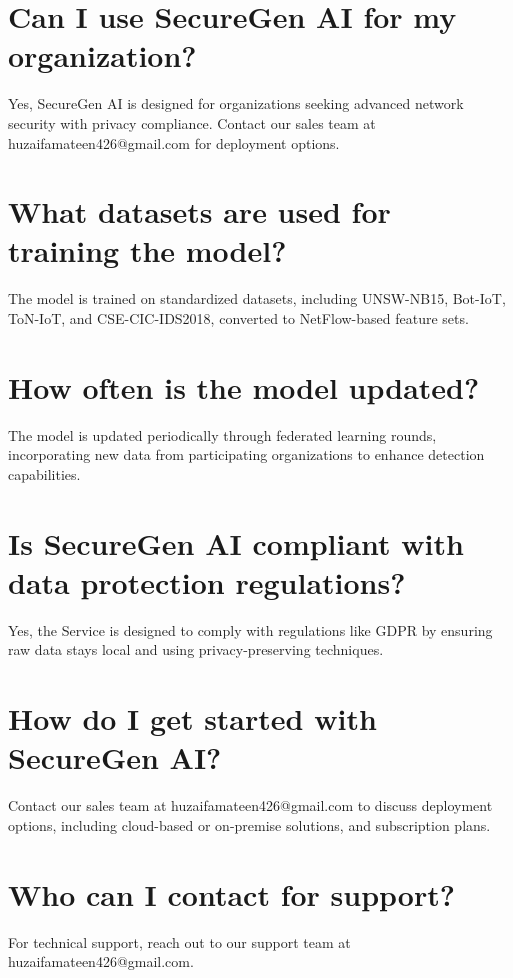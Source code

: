 \documentclass[12pt]{article}
\begin{document}
\section*{Can I use SecureGen AI for my organization?}
Yes, SecureGen AI is designed for organizations seeking advanced network security with privacy compliance. Contact our sales team at huzaifamateen426@gmail.com for deployment options.

\section*{What datasets are used for training the model?}
The model is trained on standardized datasets, including UNSW-NB15, Bot-IoT, ToN-IoT, and CSE-CIC-IDS2018, converted to NetFlow-based feature sets.

\section*{How often is the model updated?}
The model is updated periodically through federated learning rounds, incorporating new data from participating organizations to enhance detection capabilities.

\section*{Is SecureGen AI compliant with data protection regulations?}
Yes, the Service is designed to comply with regulations like GDPR by ensuring raw data stays local and using privacy-preserving techniques.

\section*{How do I get started with SecureGen AI?}
Contact our sales team at huzaifamateen426@gmail.com to discuss deployment options, including cloud-based or on-premise solutions, and subscription plans.

\section*{Who can I contact for support?}
For technical support, reach out to our support team at huzaifamateen426@gmail.com.
\end{document}
